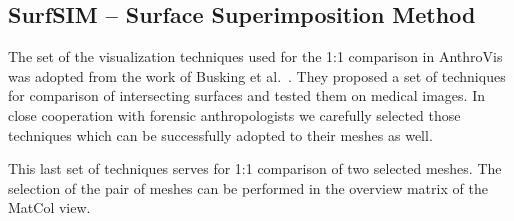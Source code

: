 \documentclass[final,5p,times]{elsarticle}
\begin{document}
\subsection{SurfSIM -- Surface Superimposition Method}
The set of the visualization techniques used for the 1:1 comparison in AnthroVis was adopted from the work of Busking et al.~\cite{busking2011image}.
They proposed a set of techniques for comparison of intersecting surfaces and tested them on medical images.
In close cooperation with forensic anthropologists we carefully selected those techniques which can be successfully adopted to their meshes as well.

This last set of techniques serves for 1:1 comparison of two selected meshes.
The selection of the pair of meshes can be performed in the overview matrix of the MatCol view.
\end{document}
